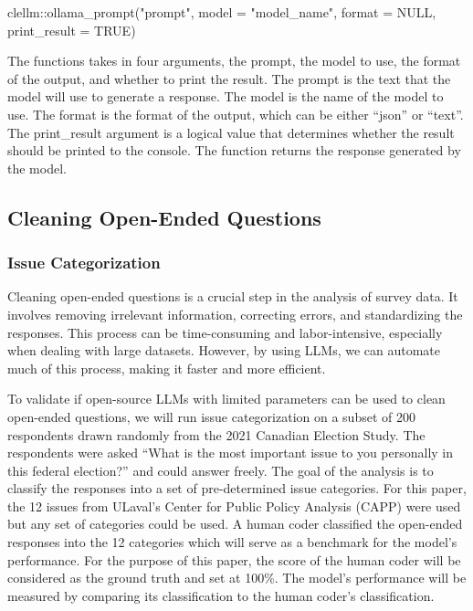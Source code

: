 \documentclass[
  authoryear,
  preprint,
  3p]{elsarticle}
\newenvironment{Shaded}{\begin{snugshade}}{\end{snugshade}}
\newcommand{\AttributeTok}[1]{\textcolor[rgb]{0.40,0.45,0.13}{#1}}
\newcommand{\ConstantTok}[1]{\textcolor[rgb]{0.56,0.35,0.01}{#1}}
\newcommand{\FunctionTok}[1]{\textcolor[rgb]{0.28,0.35,0.67}{#1}}
\newcommand{\NormalTok}[1]{\textcolor[rgb]{0.00,0.23,0.31}{#1}}
\newcommand{\SpecialCharTok}[1]{\textcolor[rgb]{0.37,0.37,0.37}{#1}}
\newcommand{\StringTok}[1]{\textcolor[rgb]{0.13,0.47,0.30}{#1}}
\begin{document}
\begin{Shaded}
\begin{Highlighting}[]
\NormalTok{clellm}\SpecialCharTok{::}\FunctionTok{ollama\_prompt}\NormalTok{(}\StringTok{"prompt"}\NormalTok{, }\AttributeTok{model =} \StringTok{"model\_name"}\NormalTok{, }\AttributeTok{format =} \ConstantTok{NULL}\NormalTok{, }\AttributeTok{print\_result =} \ConstantTok{TRUE}\NormalTok{) }
\end{Highlighting}
\end{Shaded}

The functions takes in four arguments, the prompt, the model to use, the
format of the output, and whether to print the result. The prompt is the
text that the model will use to generate a response. The model is the
name of the model to use. The format is the format of the output, which
can be either ``json'' or ``text''. The print\_result argument is a
logical value that determines whether the result should be printed to
the console. The function returns the response generated by the model.

\subsection{Cleaning Open-Ended
Questions}\label{cleaning-open-ended-questions}

\subsubsection{Issue Categorization}\label{issue-categorization}

Cleaning open-ended questions is a crucial step in the analysis of
survey data. It involves removing irrelevant information, correcting
errors, and standardizing the responses. This process can be
time-consuming and labor-intensive, especially when dealing with large
datasets. However, by using LLMs, we can automate much of this process,
making it faster and more efficient.

To validate if open-source LLMs with limited parameters can be used to
clean open-ended questions, we will run issue categorization on a subset
of 200 respondents drawn randomly from the 2021 Canadian Election Study.
The respondents were asked ``What is the most important issue to you
personally in this federal election?'' and could answer freely. The goal
of the analysis is to classify the responses into a set of
pre-determined issue categories. For this paper, the 12 issues from
ULaval's Center for Public Policy Analysis (CAPP) were used but any set
of categories could be used. A human coder classified the open-ended
responses into the 12 categories which will serve as a benchmark for the
model's performance. For the purpose of this paper, the score of the
human coder will be considered as the ground truth and set at 100\%. The
model's performance will be measured by comparing its classification to
the human coder's classification.
\end{document}
